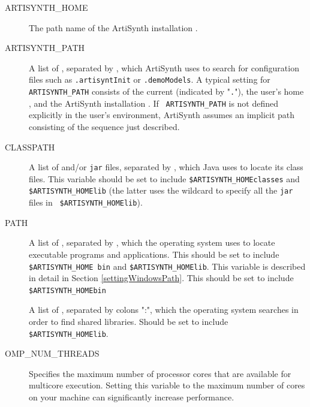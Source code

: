 \begin{description}

\item[ARTISYNTH\_HOME]\mbox{}
 
The path name of the ArtiSynth installation \directory.

\item[ARTISYNTH\_PATH]\mbox{}

A list of \directories, separated by \separatorDesc, which ArtiSynth
uses to search for configuration files such as {\tt .artisyntInit} or
{\tt .demoModels}.  A typical setting for {\tt ARTISYNTH\_PATH}
consists of the current \directory (indicated by "{\tt .}"), the user's
home \directory, and the ArtiSynth installation \directory. If {\tt
ARTISYNTH\_PATH} is not defined explicitly in the user's environment,
ArtiSynth assumes an implicit path consisting of the \directory
sequence just described.

\item[CLASSPATH]\mbox{}

A list of \directories and/or {\tt jar} files, separated by
\separatorDesc, which Java uses to locate its class files. This
variable should be set to include {\tt \$ARTISYNTH\_HOME\SEP classes}
and {\tt \$ARTISYNTH\_HOME\SEP lib\SEP *} (the latter uses the
wildcard {\tt *} to specify all the {\tt jar} files in {\tt
\$ARTISYNTH\_HOME\SEP lib}).

\item[PATH]\mbox{}
 
A list of \directories, separated by \separatorDesc, which the
operating system uses to locate executable programs and
applications. 
\ifWindows
This should be set to include {\tt \$ARTISYNTH\_HOME\SEP
bin} and {\tt \$ARTISYNTH\_HOME\SEP lib\SEP \ARCH}.
This variable is described in detail in Section \ref{settingWindowsPath}.
\else
This should be set to include {\tt \$ARTISYNTH\_HOME\SEP bin}
\fi

\ifWindows\else
\item[\LIBRARYPATH]\mbox{}

A list of \directories, separated by colons
":", which the operating system searches in order to find shared libraries.
Should be set to include {\tt \$ARTISYNTH\_HOME\SEP lib\SEP \ARCH}.
\fi

\item[OMP\_NUM\_THREADS]\mbox{}
 
Specifies the maximum number of processor cores that are available for
multicore execution. Setting this variable to the maximum number of
cores on your machine can significantly increase performance.

\end{description}

